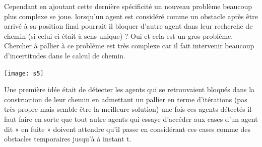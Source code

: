 \documentclass{article}
\begin{document}
Cependant en ajoutant cette dernière spécificité un nouveau problème beaucoup plus complexe se joue. lorsqu’un agent est considéré comme un obstacle après être arrivé à sa position final pourrait il bloquer d’autre agent dans leur recherche de chemin (si celui ci était à sens unique) ? Oui et cela est un gros problème. Chercher à pallier à ce problème est très complexe car il fait intervenir beaucoup d’incertitudes dans le calcul de chemin. \\

\begin{center}
	\texttt{[image: s5]}
\end{center}

Une première idée était de détecter les agents qui se retrouvaient bloqués dans la construction de leur chemin en admettant un pallier en terme d’itérations (pas très propre mais semble être la meilleure solution) une fois ces agents détectés il faut faire en sorte que tout autre agents qui essaye d’accéder aux cases d’un agent dit « en fuite » doivent attendre qu’il passe en considérant ces cases comme des obstacles temporaires jusqu'à à instant t.
\end{document}
